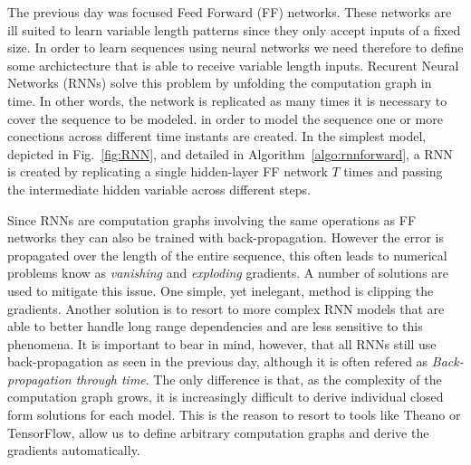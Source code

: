 The previous day was focused Feed Forward (FF) networks. These networks are ill suited to learn variable
length patterns since they only accept inputs of a fixed size. In order to
learn sequences using neural networks we need therefore to define some
archictecture that is able to receive variable length inputs. Recurent Neural
 Networks (RNNs) solve this problem by unfolding the computation graph in time.
In other words, the network is replicated as many times it is necessary to
cover the sequence to be modeled. in order
to model the sequence one or more conections across different time instants are
created. In the simplest model, depicted in Fig.~\ref{fig:RNN}, and detailed in
Algorithm~\ref{algo:rnnforward}, a RNN is created by replicating a single
hidden-layer FF network $T$ times and passing the intermediate hidden variable
across different steps. 

Since RNNs are computation graphs involving the same operations as FF networks
they can also be trained with back-propagation. However the error is
 propagated over the length of the entire sequence, this often leads to 
numerical problems know as \textit{vanishing} and \textit{exploding} gradients.
A number of solutions are used to mitigate this issue. One simple, yet inelegant,
method is clipping the gradients. Another solution is to resort to more complex 
RNN models that are able to better handle long range dependencies and are less
sensitive to this phenomena. It is important to bear in mind, however, that
all RNNs still use back-propagation as seen in the previous day, although it is often refered as \textit{Back-propagation through time}. The only
difference is that, as the complexity of the computation graph grows, it is
increasingly difficult to derive individual closed form solutions for each model.
This is the reason to resort to tools like Theano or TensorFlow, allow us
to define arbitrary computation graphs and derive the gradients automatically.

